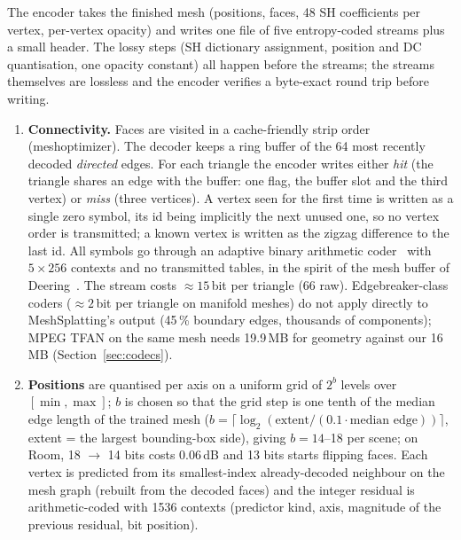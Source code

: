 \documentclass[11pt,a4paper]{article}
\begin{document}
The encoder takes the finished mesh (positions, faces, 48 SH coefficients per vertex, per-vertex opacity) and writes one file of five entropy-coded streams plus a small header. The lossy steps (SH dictionary assignment, position and DC quantisation, one opacity constant) all happen before the streams; the streams themselves are lossless and the encoder verifies a byte-exact round trip before writing.
\begin{enumerate}[nosep,leftmargin=*]
  \item \textbf{Connectivity.} Faces are visited in a cache-friendly strip order (meshoptimizer). The decoder keeps a ring buffer of the 64 most recently decoded \emph{directed} edges. For each triangle the encoder writes either \emph{hit} (the triangle shares an edge with the buffer: one flag, the buffer slot and the third vertex) or \emph{miss} (three vertices). A vertex seen for the first time is written as a single zero symbol, its id being implicitly the next unused one, so no vertex order is transmitted; a known vertex is written as the zigzag difference to the last id. All symbols go through an adaptive binary arithmetic coder~\cite{witten1987} with $5\times 256$ contexts and no transmitted tables, in the spirit of the mesh buffer of Deering~\cite{deering1995}. The stream costs $\approx 15$\,bit per triangle (66 raw). Edgebreaker-class coders ($\approx 2$\,bit per triangle on manifold meshes) do not apply directly to MeshSplatting's output (45\,\% boundary edges, thousands of components); MPEG TFAN on the same mesh needs 19.9\,MB for geometry against our 16\,MB (Section~\ref{sec:codecs}).
  \item \textbf{Positions} are quantised per axis on a uniform grid of $2^b$ levels over $[\min, \max]$; $b$ is chosen so that the grid step is one tenth of the median edge length of the trained mesh ($b = \lceil \log_2(\text{extent} / (0.1\cdot\text{median edge})) \rceil$, extent = the largest bounding-box side), giving $b = 14$--18 per scene; on Room, 18 $\to$ 14 bits costs 0.06\,dB and 13 bits starts flipping faces. Each vertex is predicted from its smallest-index already-decoded neighbour on the mesh graph (rebuilt from the decoded faces) and the integer residual is arithmetic-coded with 1536 contexts (predictor kind, axis, magnitude of the previous residual, bit position).

\end{enumerate}
\end{document}
